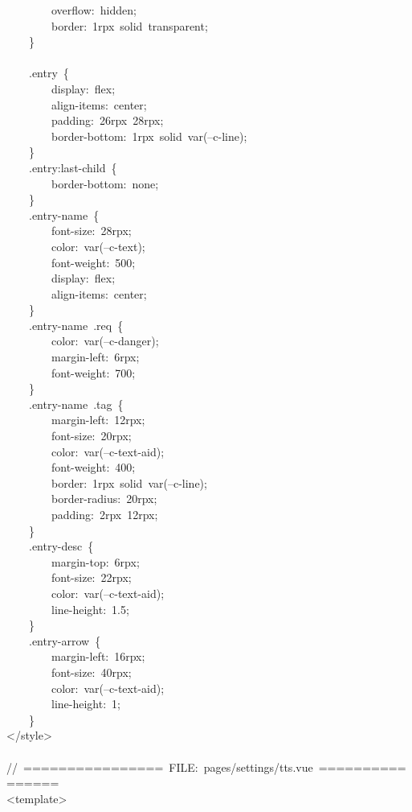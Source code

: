 \documentclass[a4paper,10pt]{article}
\begin{document}
\newpage

{\ttfamily\footnotesize\raggedright
~~~~~~~~overflow:~hidden;\\
~~~~~~~~border:~1rpx~solid~transparent;\\
~~~~\}\\
\mbox{}\\
~~~~.entry~\{\\
~~~~~~~~display:~flex;\\
~~~~~~~~align-items:~center;\\
~~~~~~~~padding:~26rpx~28rpx;\\
~~~~~~~~border-bottom:~1rpx~solid~var(--c-line);\\
~~~~\}\\
~~~~.entry:last-child~\{\\
~~~~~~~~border-bottom:~none;\\
~~~~\}\\
~~~~.entry-name~\{\\
~~~~~~~~font-size:~28rpx;\\
~~~~~~~~color:~var(--c-text);\\
~~~~~~~~font-weight:~500;\\
~~~~~~~~display:~flex;\\
~~~~~~~~align-items:~center;\\
~~~~\}\\
~~~~.entry-name~.req~\{\\
~~~~~~~~color:~var(--c-danger);\\
~~~~~~~~margin-left:~6rpx;\\
~~~~~~~~font-weight:~700;\\
~~~~\}\\
~~~~.entry-name~.tag~\{\\
~~~~~~~~margin-left:~12rpx;\\
~~~~~~~~font-size:~20rpx;\\
~~~~~~~~color:~var(--c-text-aid);\\
~~~~~~~~font-weight:~400;\\
~~~~~~~~border:~1rpx~solid~var(--c-line);\\
~~~~~~~~border-radius:~20rpx;\\
~~~~~~~~padding:~2rpx~12rpx;\\
~~~~\}\\
~~~~.entry-desc~\{\\
~~~~~~~~margin-top:~6rpx;\\
~~~~~~~~font-size:~22rpx;\\
~~~~~~~~color:~var(--c-text-aid);\\
~~~~~~~~line-height:~1.5;\\
~~~~\}\\
~~~~.entry-arrow~\{\\
~~~~~~~~margin-left:~16rpx;\\
~~~~~~~~font-size:~40rpx;\\
~~~~~~~~color:~var(--c-text-aid);\\
~~~~~~~~line-height:~1;\\
~~~~\}\\
</style>\\
\mbox{}\\
//~================~FILE:~pages/settings/tts.vue~================\\
<template>
}
\end{document}
